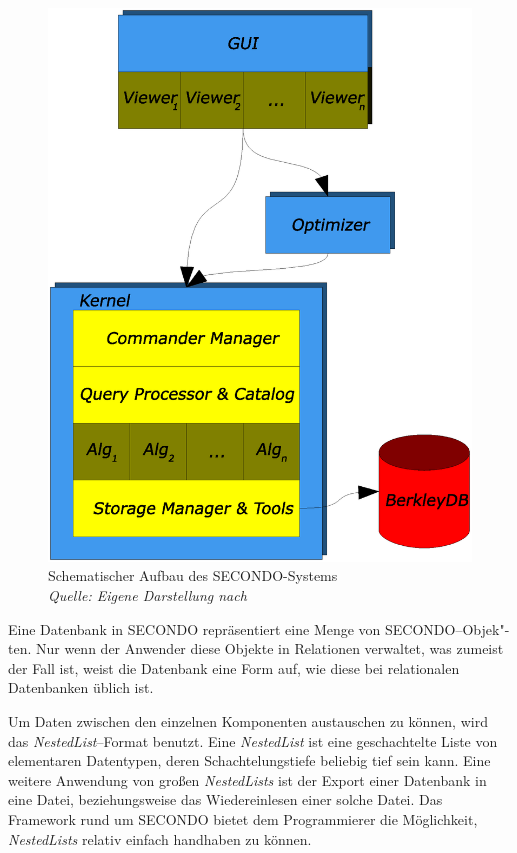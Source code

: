 \begin{figure}
	\centering
	\includegraphics[scale=0.4]{SECONDO.eps}
	\caption[Schematischer Aufbau des SECONDO-Systems]{Schematischer Aufbau des SECONDO-Systems\\\textit{Quelle: Eigene Darstellung nach \cite{Mue}}}
	\label{fig:AufbauSec}
\end{figure}

Eine Datenbank in SECONDO repräsentiert eine Menge von SECONDO--Objek"-ten. Nur wenn der Anwender diese Objekte in Relationen verwaltet, was zumeist der Fall ist, weist die Datenbank eine Form auf, wie diese bei relationalen Datenbanken üblich ist.

Um Daten zwischen den einzelnen Komponenten austauschen zu können, wird das \textit{NestedList}--Format benutzt. Eine \textit{NestedList} ist eine geschachtelte Liste von elementaren Datentypen, deren Schachtelungstiefe beliebig tief sein kann. Eine weitere Anwendung von großen \textit{NestedLists} ist der Export einer Datenbank in eine Datei, beziehungsweise das Wiedereinlesen einer solche Datei. Das Framework rund um SECONDO bietet dem Programmierer die Möglichkeit, \textit{NestedLists} relativ einfach handhaben zu können.


